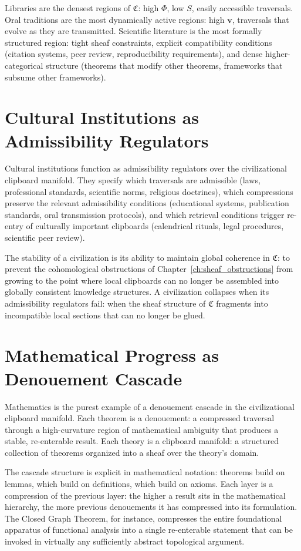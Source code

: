 \documentclass[12pt,oneside]{book}
\theoremstyle{plain}
\theoremstyle{definition}
\theoremstyle{plain}
\newcommand{\fC}{\mathfrak{C}}
\begin{document}
Libraries are the densest regions of $\fC$: high $\Phi$, low $S$, easily accessible traversals. Oral traditions are the most dynamically active regions: high $\mathbf{v}$, traversals that evolve as they are transmitted. Scientific literature is the most formally structured region: tight sheaf constraints, explicit compatibility conditions (citation systems, peer review, reproducibility requirements), and dense higher-categorical structure (theorems that modify other theorems, frameworks that subsume other frameworks).

\section{Cultural Institutions as Admissibility Regulators}

Cultural institutions function as admissibility regulators over the civilizational clipboard manifold. They specify which traversals are admissible (laws, professional standards, scientific norms, religious doctrines), which compressions preserve the relevant admissibility conditions (educational systems, publication standards, oral transmission protocols), and which retrieval conditions trigger re-entry of culturally important clipboards (calendrical rituals, legal procedures, scientific peer review).

The stability of a civilization is its ability to maintain global coherence in $\fC$: to prevent the cohomological obstructions of Chapter~\ref{ch:sheaf_obstructions} from growing to the point where local clipboards can no longer be assembled into globally consistent knowledge structures. A civilization collapses when its admissibility regulators fail: when the sheaf structure of $\fC$ fragments into incompatible local sections that can no longer be glued.

\section{Mathematical Progress as Denouement Cascade}

Mathematics is the purest example of a denouement cascade in the civilizational clipboard manifold. Each theorem is a denouement: a compressed traversal through a high-curvature region of mathematical ambiguity that produces a stable, re-enterable result. Each theory is a clipboard manifold: a structured collection of theorems organized into a sheaf over the theory's domain.

The cascade structure is explicit in mathematical notation: theorems build on lemmas, which build on definitions, which build on axioms. Each layer is a compression of the previous layer: the higher a result sits in the mathematical hierarchy, the more previous denouements it has compressed into its formulation. The Closed Graph Theorem, for instance, compresses the entire foundational apparatus of functional analysis into a single re-enterable statement that can be invoked in virtually any sufficiently abstract topological argument.
\end{document}
